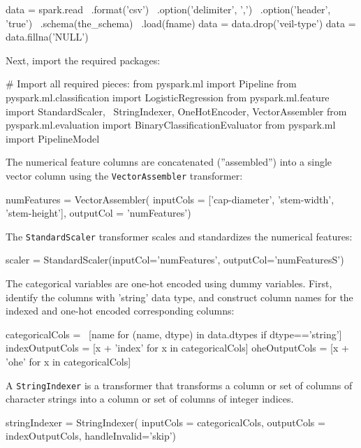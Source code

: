 \begin{withcode}
\begin{pythoncode}
data = spark.read \
    .format('csv') \
    .option('delimiter', ',') \
    .option('header', 'true') \
    .schema(the_schema) \
    .load(fname)
data = data.drop('veil-type')
data = data.fillna('NULL')
\end{pythoncode}

Next, import the required packages:
\begin{pythoncode}
# Import all required pieces:
from pyspark.ml import Pipeline
from pyspark.ml.classification import LogisticRegression
from pyspark.ml.feature import StandardScaler, \
    StringIndexer, OneHotEncoder, VectorAssembler
from pyspark.ml.evaluation import BinaryClassificationEvaluator
from pyspark.ml import PipelineModel
\end{pythoncode}

The numerical feature columns are concatenated (''assembled'') into a single vector column using the \texttt{VectorAssembler} transformer:
\begin{pythoncode}
numFeatures = VectorAssembler(
    inputCols = ['cap-diameter', 'stem-width', 'stem-height'],
    outputCol = 'numFeatures')
\end{pythoncode}

The \texttt{StandardScaler} transformer scales and standardizes the numerical features:
\begin{pythoncode}
scaler = StandardScaler(inputCol='numFeatures',
                        outputCol='numFeaturesS')
\end{pythoncode}

The categorical variables are one-hot encoded using dummy variables. First, identify the columns with 'string' data type, and construct column names for the indexed and one-hot encoded corresponding columns:

\begin{pythoncode}
categoricalCols = \
    [name for (name, dtype) in data.dtypes if dtype=='string']
indexOutputCols = [x + 'index' for x in categoricalCols]
oheOutputCols = [x + 'ohe' for x in categoricalCols]
\end{pythoncode}

A \texttt{StringIndexer} is a transformer that transforms a column or set of columns of character strings into a column or set of columns of integer indices.

\begin{pythoncode}
stringIndexer = StringIndexer(
    inputCols = categoricalCols,
    outputCols = indexOutputCols,
    handleInvalid='skip')
\end{pythoncode}


\end{withcode}

